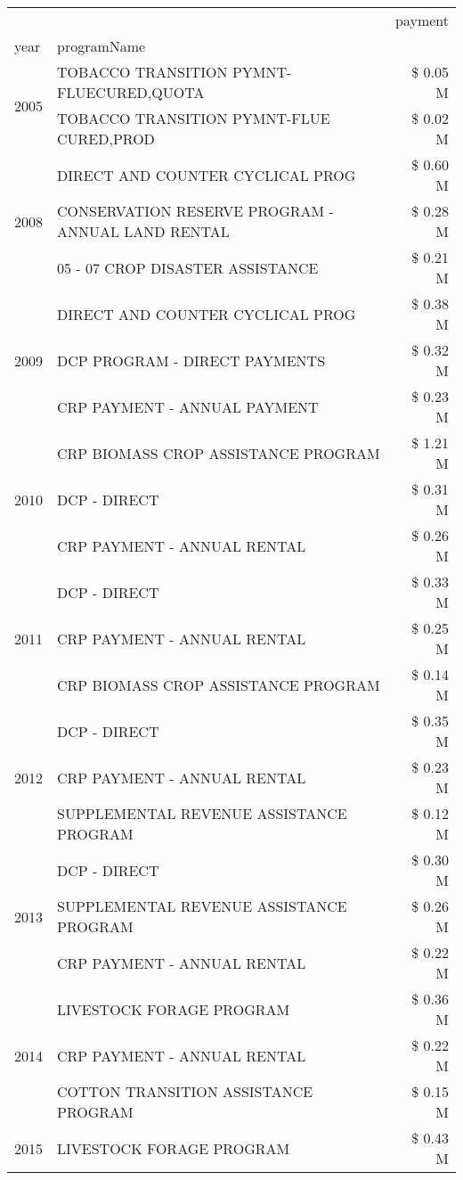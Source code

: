 \begin{tabular}{llr}
\toprule
 &  & payment \\
year & programName &  \\
\midrule
\multirow[t]{2}{*}{2005} & TOBACCO TRANSITION PYMNT-FLUECURED,QUOTA & \$ 0.05 M \\
 & TOBACCO TRANSITION PYMNT-FLUE CURED,PROD & \$ 0.02 M \\
\cline{1-3}
\multirow[t]{3}{*}{2008} & DIRECT AND COUNTER CYCLICAL PROG & \$ 0.60 M \\
 & CONSERVATION RESERVE PROGRAM - ANNUAL LAND RENTAL & \$ 0.28 M \\
 & 05 - 07 CROP DISASTER ASSISTANCE & \$ 0.21 M \\
\cline{1-3}
\multirow[t]{3}{*}{2009} & DIRECT AND COUNTER CYCLICAL PROG & \$ 0.38 M \\
 & DCP PROGRAM - DIRECT PAYMENTS & \$ 0.32 M \\
 & CRP PAYMENT - ANNUAL PAYMENT & \$ 0.23 M \\
\cline{1-3}
\multirow[t]{3}{*}{2010} & CRP BIOMASS CROP ASSISTANCE PROGRAM & \$ 1.21 M \\
 & DCP - DIRECT & \$ 0.31 M \\
 & CRP PAYMENT - ANNUAL RENTAL & \$ 0.26 M \\
\cline{1-3}
\multirow[t]{3}{*}{2011} & DCP - DIRECT & \$ 0.33 M \\
 & CRP PAYMENT - ANNUAL RENTAL & \$ 0.25 M \\
 & CRP BIOMASS CROP ASSISTANCE PROGRAM & \$ 0.14 M \\
\cline{1-3}
\multirow[t]{3}{*}{2012} & DCP - DIRECT & \$ 0.35 M \\
 & CRP PAYMENT - ANNUAL RENTAL & \$ 0.23 M \\
 & SUPPLEMENTAL REVENUE ASSISTANCE PROGRAM & \$ 0.12 M \\
\cline{1-3}
\multirow[t]{3}{*}{2013} & DCP - DIRECT & \$ 0.30 M \\
 & SUPPLEMENTAL REVENUE ASSISTANCE PROGRAM & \$ 0.26 M \\
 & CRP PAYMENT - ANNUAL RENTAL & \$ 0.22 M \\
\cline{1-3}
\multirow[t]{3}{*}{2014} & LIVESTOCK FORAGE PROGRAM & \$ 0.36 M \\
 & CRP PAYMENT - ANNUAL RENTAL & \$ 0.22 M \\
 & COTTON TRANSITION ASSISTANCE PROGRAM & \$ 0.15 M \\
\cline{1-3}
\multirow[t]{3}{*}{2015} & LIVESTOCK FORAGE PROGRAM & \$ 0.43 M \\

\end{tabular}
